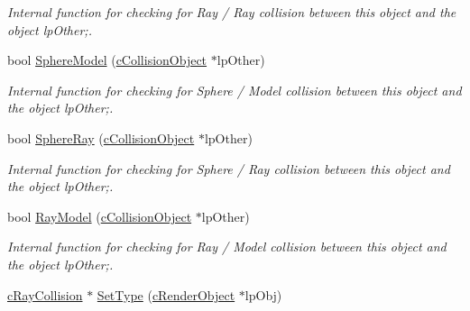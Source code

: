 \begin{DoxyCompactItemize}
\begin{DoxyCompactList}\small\item\em Internal function for checking for Ray / Ray collision between this object and the object lpOther;. \end{DoxyCompactList}\item 
\hypertarget{classc_collision_object_a299e49b5d78e1e7dbe5e801c7760462a}{
bool \hyperlink{classc_collision_object_a299e49b5d78e1e7dbe5e801c7760462a}{SphereModel} (\hyperlink{classc_collision_object}{cCollisionObject} $\ast$lpOther)}
\label{classc_collision_object_a299e49b5d78e1e7dbe5e801c7760462a}

\begin{DoxyCompactList}\small\item\em Internal function for checking for Sphere / Model collision between this object and the object lpOther;. \end{DoxyCompactList}\item 
\hypertarget{classc_collision_object_ae4761ec4a0f60667e83cb6d4cf39d359}{
bool \hyperlink{classc_collision_object_ae4761ec4a0f60667e83cb6d4cf39d359}{SphereRay} (\hyperlink{classc_collision_object}{cCollisionObject} $\ast$lpOther)}
\label{classc_collision_object_ae4761ec4a0f60667e83cb6d4cf39d359}

\begin{DoxyCompactList}\small\item\em Internal function for checking for Sphere / Ray collision between this object and the object lpOther;. \end{DoxyCompactList}\item 
\hypertarget{classc_collision_object_a7ccea939e1f91fa7eeda4c31128901c3}{
bool \hyperlink{classc_collision_object_a7ccea939e1f91fa7eeda4c31128901c3}{RayModel} (\hyperlink{classc_collision_object}{cCollisionObject} $\ast$lpOther)}
\label{classc_collision_object_a7ccea939e1f91fa7eeda4c31128901c3}

\begin{DoxyCompactList}\small\item\em Internal function for checking for Ray / Model collision between this object and the object lpOther;. \end{DoxyCompactList}\item 
\hypertarget{classc_collision_object_a8677f76a5812003334092737348a42c5}{
\hyperlink{classc_ray_collision}{cRayCollision} $\ast$ \hyperlink{classc_collision_object_a8677f76a5812003334092737348a42c5}{SetType} (\hyperlink{classc_render_object}{cRenderObject} $\ast$lpObj)}
\label{classc_collision_object_a8677f76a5812003334092737348a42c5}


\end{DoxyCompactItemize}
